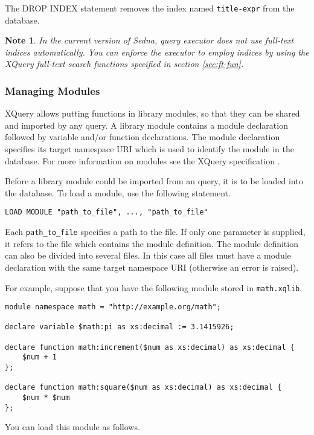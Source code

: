 \documentclass[a4paper,12pt]{article}
\newtheorem{note}{Note}
\begin{document}
The DROP INDEX statement removes the index named \verb!title-expr! from the database.

\begin{note}In the current version of Sedna, query executor does not use full-text indices automatically. You can enforce the executor to employ indices by
using the XQuery full-text search functions specified in section \ref{sec:ft-fun}.
\end{note}

\subsubsection{Managing Modules}
XQuery allows putting functions in library modules, so that they can be shared and imported by any query.
A library module contains a module declaration followed by variable and/or function declarations. The module declaration specifies its target namespace URI which is used to identify the module in the database. For more information on modules see the XQuery specification \cite{paper:query-language}.

Before a library module could be imported from an query, it is to be loaded into the database. To load a module, use the following statement.

\begin{verbatim}
LOAD MODULE "path_to_file", ..., "path_to_file"
\end{verbatim}

Each \verb!path_to_file! specifies a path to the file. If only one parameter is supplied, it refers to the file which contains the module definition. The module definition can also be divided into several files. In this case all files must have a module declaration with the same target namespace URI (otherwise an error is raised).

For example, suppose that you have the following module stored in \verb!math.xqlib!.

\begin{verbatim}
module namespace math = "http://example.org/math";

declare variable $math:pi as xs:decimal := 3.1415926;

declare function math:increment($num as xs:decimal) as xs:decimal {
    $num + 1
};

declare function math:square($num as xs:decimal) as xs:decimal {
    $num * $num
};
\end{verbatim}

You can load this module as follows.
\end{document}

